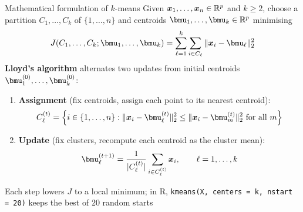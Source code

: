 \documentclass[aspectratio=169]{beamer}\usepackage[]{graphicx}\usepackage[]{xcolor}
\begin{document}
\begin{frame}{Mathematical formulation of $k$-means}
Given $\bm{x}_1, \ldots, \bm{x}_n \in \mathbb{R}^p$ and $k \ge 2$, choose a partition $C_1, \ldots, C_k$ of $\{1, \ldots, n\}$ and centroids $\bmu_1, \ldots, \bmu_k \in \IR^p$ minimising
\[
J(C_1, \ldots, C_k; \bmu_1, \ldots, \bmu_k) = \sum_{\ell=1}^k \sum_{i \in C_\ell} \|\bx_i - \bmu_\ell\|_2^2
\]
\textbf{Lloyd's algorithm} alternates two updates from initial centroids $\bmu_1^{(0)}, \ldots, \bmu_k^{(0)}$:
\begin{enumerate}
\item \textbf{Assignment} (fix centroids, assign each point to its nearest centroid):
\[
C_\ell^{(t)} = \Bigl\{i \in \{1, \ldots, n\} : \|\bx_i - \bmu_\ell^{(t)}\|_2^2 \le \|\bx_i - \bmu_m^{(t)}\|_2^2 \text{ for all } m\Bigr\}
\]
\item \textbf{Update} (fix clusters, recompute each centroid as the cluster mean):
\[
\bmu_\ell^{(t+1)} = \frac{1}{|C_\ell^{(t)}|} \sum_{i \in C_\ell^{(t)}} \bx_i, \qquad \ell = 1, \ldots, k
\]
\end{enumerate}
Each step lowers $J$ to a local minimum; in R, \texttt{kmeans(X, centers = k, nstart = 20)} keeps the best of $20$ random starts
\end{frame}
\end{document}
